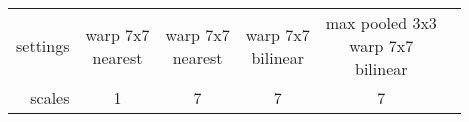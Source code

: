 \begin{tabular}{@{}rccccl@{}}
\toprule
settings      & \mcell{warp 7x7\\nearest}  & \mcell{warp 7x7\\nearest}  & \mcell{warp 7x7\\bilinear}  & \mcell{max pooled 3x3\\warp 7x7\\bilinear} \\
scales        & 1                          & 7                           & 7                          & 7 \\
\midrule

\end{tabular}

